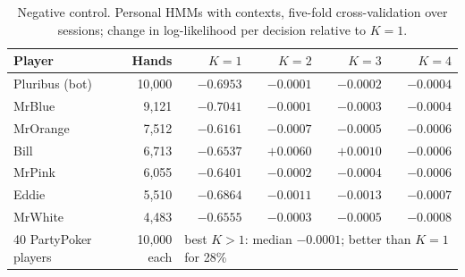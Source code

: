\begin{table}[h]
\caption{Negative control. Personal HMMs with contexts, five-fold cross-validation over sessions; change in log-likelihood per decision relative to $K=1$.}
\label{tab:pluribus}
\centering\small
\begin{tabular}{lrrrrr}
\toprule
Player & Hands & $K=1$ & $K=2$ & $K=3$ & $K=4$\\
\midrule
Pluribus (bot) & 10{,}000 & $-0.6953$ & $-0.0001$ & $-0.0002$ & $-0.0004$\\
MrBlue & 9{,}121 & $-0.7041$ & $-0.0001$ & $-0.0003$ & $-0.0004$\\
MrOrange & 7{,}512 & $-0.6161$ & $-0.0007$ & $-0.0005$ & $-0.0006$\\
Bill & 6{,}713 & $-0.6537$ & $+0.0060$ & $+0.0010$ & $-0.0006$\\
MrPink & 6{,}055 & $-0.6401$ & $-0.0002$ & $-0.0004$ & $-0.0006$\\
Eddie & 5{,}510 & $-0.6864$ & $-0.0011$ & $-0.0013$ & $-0.0007$\\
MrWhite & 4{,}483 & $-0.6555$ & $-0.0003$ & $-0.0005$ & $-0.0008$\\
\midrule
40 PartyPoker players & 10{,}000 each & \multicolumn{4}{l}{best $K>1$: median $-0.0001$; better than $K=1$ for 28\%}\\
\bottomrule
\end{tabular}
\end{table}
